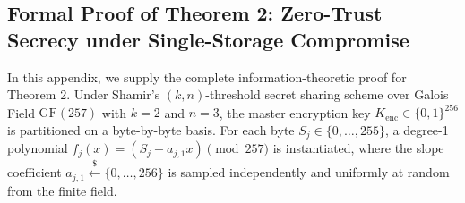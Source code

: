 \documentclass[sn-mathphys,Numbered]{sn-jnl}%
\theoremstyle{thmstyleone}%
\theoremstyle{thmstyletwo}%
\theoremstyle{thmstylethree}%
\begin{document}
\FloatBarrier
\begin{appendices}
\section{Formal Proof of Theorem 2: Zero-Trust Secrecy under Single-Storage Compromise}\label{secA1}
In this appendix, we supply the complete information-theoretic proof for Theorem 2. Under Shamir's $(k,n)$-threshold secret sharing scheme over Galois Field $\text{GF}(257)$ with $k=2$ and $n=3$, the master encryption key $K_{\text{enc}} \in \{0,1\}^{256}$ is partitioned on a byte-by-byte basis. For each byte $S_j \in \{0,\dots,255\}$, a degree-1 polynomial $f_j(x) = (S_j + a_{j,1} x) \pmod{257}$ is instantiated, where the slope coefficient $a_{j,1} \xleftarrow{\$} \{0,\dots,256\}$ is sampled independently and uniformly at random from the finite field.


\end{appendices}
\end{document}
